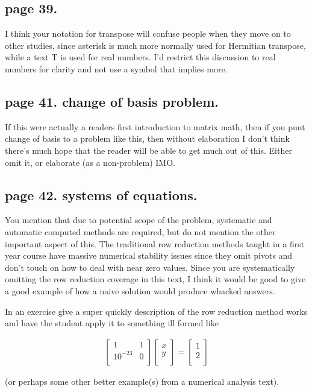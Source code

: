 \documentclass{article}
\begin{document}
\subsection{page 39. }

I think your notation for transpose will confuse people when they move on to other studies, since asterisk is much more normally used for Hermitian transpose,
while a text T is used for real numbers.  I'd restrict this discussion to real
numbers for clarity and not use a symbol that implies more.

\subsection{page 41. change of basis problem. }

If this were actually a readers first introduction to matrix math, then
if you punt change of basis to a problem like this, then without elaboration
I don't think there's much hope that the reader will be able to get much out
of this.  Either omit it, or elaborate (as a non-problem) IMO.

\subsection{page 42. systems of equations. }

You mention that due to potential scope of the problem, systematic and automatic computed methods are required, but do not mention the other important aspect of this.  The traditional row reduction methods taught in a first year course have massive numerical stability issues since they omit pivots and don't touch on how to deal with near zero values.  Since you are systematically omitting the row reduction coverage in this text, I think it would be good to give a good example of how a naive solution would produce whacked answers.

In an exercise give a super quickly description of the row reduction method works and have the student apply it to something ill formed like

\begin{align*}
\begin{bmatrix}
1 & 1 \\
10^{-23} & 0 \\
\end{bmatrix}
\begin{bmatrix}
x \\
y \\
\end{bmatrix}
=
\begin{bmatrix}
1 \\
2 \\
\end{bmatrix}
\end{align*}

(or perhaps some other better example(s) from a numerical analysis text).

%
%
\end{document}
